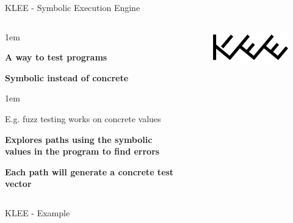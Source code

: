 \begin{frame}{KLEE - Symbolic Execution Engine}
    \begin{columns}
        \begin{itemize-size}{1em}
            \item \textbf{A way to test programs}
            \item \textbf{Symbolic instead of concrete}
            \begin{itemize-size}{1em}
                \item E.g. fuzz testing works on concrete values
            \end{itemize-size}
        \item \textbf{Explores paths using the symbolic values in the program
            to find errors}
        \item \textbf{Each path will generate a concrete test vector}
        \end{itemize-size}

        \begin{figure}
            \centering
            \includegraphics[scale=0.55]{pictures/klee.png}
        \end{figure}
    \end{columns}
\end{frame}

\begin{frame}{KLEE - Example}

\end{frame}

